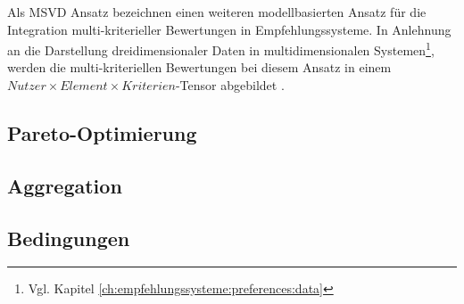 Als \ac{MSVD} Ansatz bezeichnen \textcite[S. 864]{adomavicius:4:inbook} einen weiteren modellbasierten Ansatz für die Integration multi-kriterieller Bewertungen in Empfehlungssysteme.
In Anlehnung an die Darstellung dreidimensionaler Daten in multidimensionalen Systemen\footnote{Vgl. Kapitel \ref{ch:empfehlungssysteme:preferences:data}}, werden die multi-kriteriellen Bewertungen bei diesem Ansatz in einem $Nutzer \times Element \times Kriterien$-Tensor abgebildet \cite[S. 1235]{li:2:inproceedings}.


\subsection{Pareto-Optimierung}

\subsection{Aggregation}

\subsection{Bedingungen}


